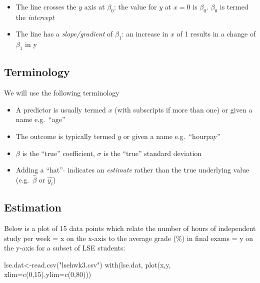 \documentclass[
]{gitbook}
\newenvironment{Shaded}{\begin{snugshade}}{\end{snugshade}}
\newcommand{\AttributeTok}[1]{\textcolor[rgb]{0.77,0.63,0.00}{#1}}
\newcommand{\DecValTok}[1]{\textcolor[rgb]{0.00,0.00,0.81}{#1}}
\newcommand{\FunctionTok}[1]{\textcolor[rgb]{0.00,0.00,0.00}{#1}}
\newcommand{\NormalTok}[1]{#1}
\newcommand{\OtherTok}[1]{\textcolor[rgb]{0.56,0.35,0.01}{#1}}
\newcommand{\StringTok}[1]{\textcolor[rgb]{0.31,0.60,0.02}{#1}}
\providecommand{\tightlist}{%
  \setlength{\itemsep}{0pt}\setlength{\parskip}{0pt}}
\begin{document}
\begin{itemize}
\tightlist
\item
  The line crosses the \(y\) axis at \(\beta_0\): the value for \(y\) at \(x=0\) is \(\beta_0\). \(\beta_0\) is termed the \emph{intercept}
\item
  The line has a \emph{slope/gradient} of \(\beta_1\): an increase in \(x\) of 1 results in a change of \(\beta_1\) in y
\end{itemize}

\hypertarget{terminology}{%
\subsection{Terminology}\label{terminology}}

We will use the following terminology

\begin{itemize}
\tightlist
\item
  A predictor is usually termed \(x\) (with subscripts if more than one) or given a name e.g.~``age''
\item
  The outcome is typically termed \(y\) or given a name e.g.~``hourpay''
\item
  \(\beta\) is the ``true'' coefficient, \(\sigma\) is the ``true'' standard deviation
\item
  Adding a ``hat'' \(\hat{}\) indicates an \emph{estimate} rather than the true underlying value (e.g.~\(\hat{\beta}\) or \(\hat{y_i}\))
\end{itemize}

\hypertarget{estimation}{%
\subsection{Estimation}\label{estimation}}

Below is a plot of 15 data points which relate the number of hours of independent study per week = x on the x-axis to the average grade (\%) in final exams = y on the y-axis for a subset of LSE students:

\begin{Shaded}
\begin{Highlighting}[]
\NormalTok{lse.dat}\OtherTok{\textless{}{-}}\FunctionTok{read.csv}\NormalTok{(}\StringTok{"lsehwk3.csv"}\NormalTok{)}
\FunctionTok{with}\NormalTok{(lse.dat, }\FunctionTok{plot}\NormalTok{(x,y, }\AttributeTok{xlim=}\FunctionTok{c}\NormalTok{(}\DecValTok{0}\NormalTok{,}\DecValTok{15}\NormalTok{),}\AttributeTok{ylim=}\FunctionTok{c}\NormalTok{(}\DecValTok{0}\NormalTok{,}\DecValTok{80}\NormalTok{)))}
\end{Highlighting}
\end{Shaded}
\end{document}

